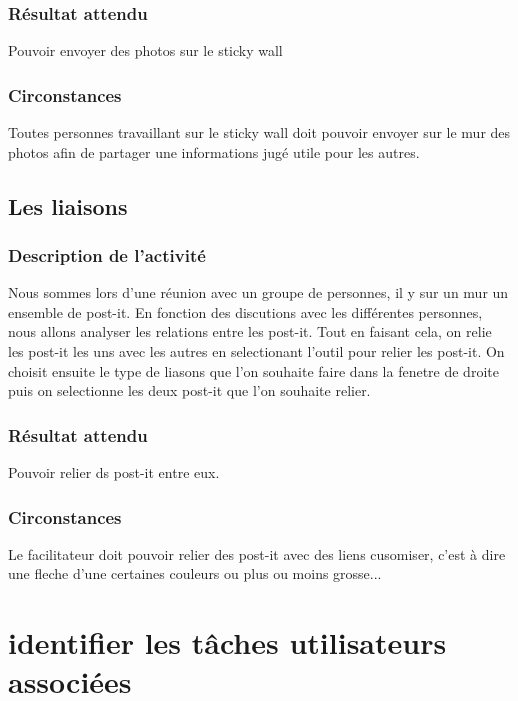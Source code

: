 \documentclass{article}
\begin{document}
\subsubsection{Résultat attendu}
Pouvoir envoyer des photos sur le sticky wall
\subsubsection{Circonstances}
Toutes personnes travaillant sur le sticky wall doit pouvoir envoyer sur le mur des photos afin de partager une informations jugé utile pour les autres.

\subsection{Les liaisons}
\subsubsection{Description de l’activité}
Nous sommes lors d'une réunion avec un groupe de personnes, il y sur un mur un ensemble de post-it. En fonction des discutions avec les différentes personnes, nous allons analyser les relations entre les post-it. Tout en faisant cela, on relie les post-it les uns avec les autres en selectionant l'outil pour relier les post-it. On choisit ensuite le type de liasons que l'on souhaite faire dans la fenetre de droite puis on selectionne les deux post-it que l'on souhaite relier.
\subsubsection{Résultat attendu}
Pouvoir relier ds post-it entre eux.
\subsubsection{Circonstances}
Le facilitateur doit pouvoir relier des post-it avec des liens cusomiser, c'est à dire une fleche d'une certaines couleurs ou plus ou moins grosse...

\section{identifier les tâches utilisateurs associées}
\end{document}
